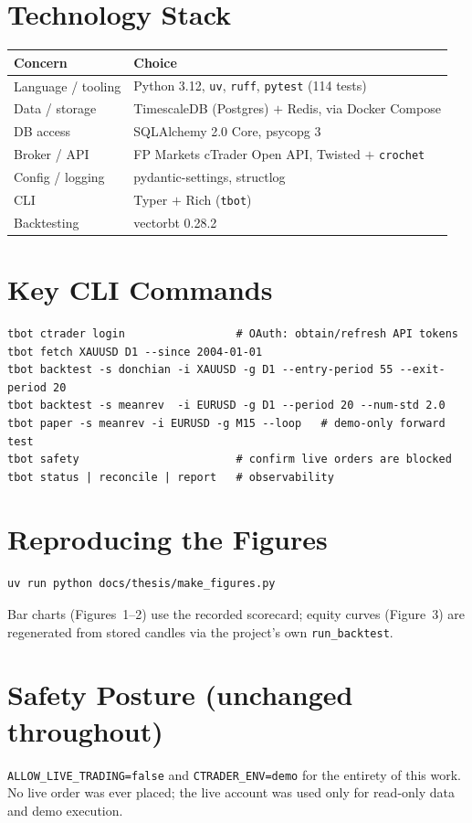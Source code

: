 \documentclass[11pt,a4paper]{article}
\newcommand{\tbot}[1]{\texttt{#1}}
\begin{document}
\appendix
\section{Technology Stack}
\begin{table}[ht]\centering
\begin{tabular}{@{}ll@{}}
\toprule
\textbf{Concern} & \textbf{Choice} \\
\midrule
Language / tooling & Python 3.12, \tbot{uv}, \tbot{ruff}, \tbot{pytest} (114 tests) \\
Data / storage & TimescaleDB (Postgres) $+$ Redis, via Docker Compose \\
DB access & SQLAlchemy 2.0 Core, psycopg 3 \\
Broker / API & FP Markets cTrader Open API, Twisted $+$ \tbot{crochet} \\
Config / logging & pydantic-settings, structlog \\
CLI & Typer $+$ Rich (\tbot{tbot}) \\
Backtesting & vectorbt 0.28.2 \\
\bottomrule
\end{tabular}
\end{table}

\section{Key CLI Commands}
\begin{verbatim}
tbot ctrader login                 # OAuth: obtain/refresh API tokens
tbot fetch XAUUSD D1 --since 2004-01-01
tbot backtest -s donchian -i XAUUSD -g D1 --entry-period 55 --exit-period 20
tbot backtest -s meanrev  -i EURUSD -g D1 --period 20 --num-std 2.0
tbot paper -s meanrev -i EURUSD -g M15 --loop   # demo-only forward test
tbot safety                        # confirm live orders are blocked
tbot status | reconcile | report   # observability
\end{verbatim}

\section{Reproducing the Figures}
\begin{verbatim}
uv run python docs/thesis/make_figures.py
\end{verbatim}
Bar charts (Figures~1--2) use the recorded scorecard; equity curves (Figure~3) are regenerated from stored candles via the project's own \texttt{run\_backtest}.

\section{Safety Posture (unchanged throughout)}
\tbot{ALLOW\_LIVE\_TRADING=false} and \tbot{CTRADER\_ENV=demo} for the entirety of this work. No live order was ever placed; the live account was used only for read-only data and demo execution.
\end{document}
